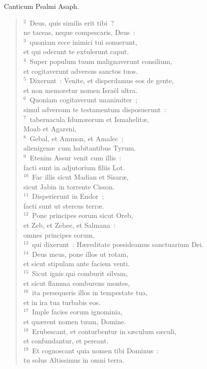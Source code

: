 \lettrine[lines=3,image=true,loversize=0.05,lraise=-0.03]{C}{}anticum Psalmi Asaph.
\begin{flushleft}\begin{verse}\vspace{6pt}${}^{2}$~Deus, quis similis erit tibi~?\\ ne taceas, neque compescaris, Deus~:\\
${}^{3}$~quoniam ecce inimici tui sonuerunt,\\ et qui oderunt te extulerunt caput.\\
${}^{4}$~Super populum tuum malignaverunt consilium,\\ et cogitaverunt adversus sanctos tuos.\\
${}^{5}$~Dixerunt~: Venite, et disperdamus eos de gente,\\ et non memoretur nomen Isra\"el ultra.\\
${}^{6}$~Quoniam cogitaverunt unanimiter~;\\ simul adversum te testamentum disposuerunt~:\\
${}^{7}$~tabernacula Idum\ae orum et Ismahelit\ae ,\\ Moab et Agareni,\\
${}^{8}$~Gebal, et Ammon, et Amalec~;\\ alienigen\ae\ cum habitantibus Tyrum.\\
${}^{9}$~Etenim Assur venit cum illis~:\\ facti sunt in adjutorium filiis Lot.\\
${}^{10}$~Fac illis sicut Madian et Sisar\ae ,\\ sicut Jabin in torrente Cisson.\\
${}^{11}$~Disperierunt in Endor~;\\ facti sunt ut stercus terr\ae .\\
${}^{12}$~Pone principes eorum sicut Oreb,\\ et Zeb, et Zebee, et Salmana~:\\ omnes principes eorum,\\
${}^{13}$~qui dixerunt~: H\ae reditate possideamus sanctuarium Dei.\\
${}^{14}$~Deus meus, pone illos ut rotam,\\ et sicut stipulam ante faciem venti.\\
${}^{15}$~Sicut ignis qui comburit silvam,\\ et sicut flamma comburens montes,\\
${}^{16}$~ita persequeris illos in tempestate tua,\\ et in ira tua turbabis eos.\\
${}^{17}$~Imple facies eorum ignominia,\\ et qu\ae rent nomen tuum, Domine.\\
${}^{18}$~Erubescant, et conturbentur in s\ae culum s\ae culi,\\ et confundantur, et pereant.\\
${}^{19}$~Et cognoscant quia nomen tibi Dominus~:\\ tu solus Altissimus in omni terra.\end{verse}\end{flushleft}



